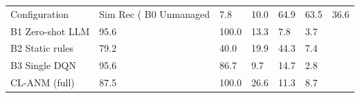 \begin{tabular}{llllll}
\toprule
Configuration & Sim Rec (%
\midrule
B0 Unmanaged & 7.8 & 10.0 & 64.9 & 63.5 & 36.6 \\
B1 Zero-shot LLM & 95.6 & 100.0 & 13.3 & 7.8 & 3.7 \\
B2 Static rules & 79.2 & 40.0 & 19.9 & 44.3 & 7.4 \\
B3 Single DQN & 95.6 & 86.7 & 9.7 & 14.7 & 2.8 \\
CL-ANM (full) & 87.5 & 100.0 & 26.6 & 11.3 & 8.7 \\
\bottomrule
\end{tabular}
